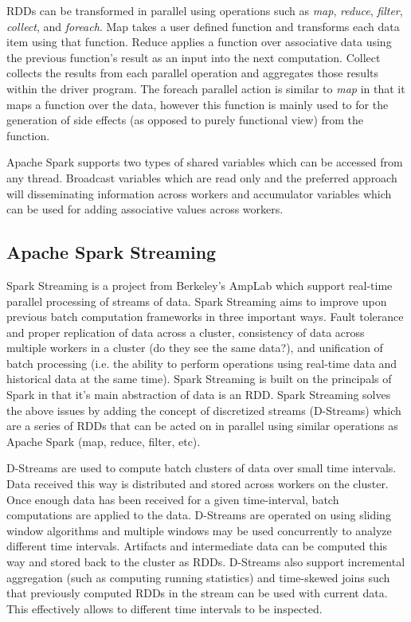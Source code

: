RDDs can be transformed in parallel using operations such as \textit{map}, \textit{reduce}, \textit{filter}, \textit{collect}, and \textit{foreach}. Map takes a user defined function and transforms each data item using that function. Reduce applies a function over associative data using the previous function's result as an input into the next computation. Collect collects the results from each parallel operation and aggregates those results within the driver program. The foreach parallel action is similar to \textit{map} in that it maps a function over the data, however this function is mainly used to for the generation of side effects (as opposed to purely functional view) from the function.

Apache Spark supports two types of shared variables which can be accessed from any thread. Broadcast variables which are read only and the preferred approach will disseminating information across workers and accumulator variables which can be used for adding associative values across workers.

\subsection{Apache Spark Streaming}
Spark Streaming \cite{zaharia2012discretized} is a project from Berkeley's AmpLab which support real-time parallel processing of streams of data. Spark Streaming aims to improve upon previous batch computation frameworks in three important ways. Fault tolerance and proper replication of data across a cluster, consistency of data across multiple workers in a cluster (do they see the same data?), and unification of batch processing (i.e. the ability to perform operations using real-time data and historical data at the same time). Spark Streaming is built on the principals of Spark in that it's main abstraction of data is an RDD. Spark Streaming solves the above issues by adding the concept of discretized streams (D-Streams) which are a series of RDDs that can be acted on in parallel using similar operations as Apache Spark (map, reduce, filter, etc).

D-Streams are used to compute batch clusters of data over small time intervals. Data received this way is distributed and stored across workers on the cluster. Once enough data has been received for a given time-interval, batch computations are applied to the data. D-Streams are operated on using sliding window algorithms and multiple windows may be used concurrently to analyze different time intervals. Artifacts and intermediate data can be computed this way and stored back to the cluster as RDDs. D-Streams also support incremental aggregation (such as computing running statistics) and time-skewed joins such that previously computed RDDs in the stream can be used with current data. This effectively allows to different time intervals to be inspected.


